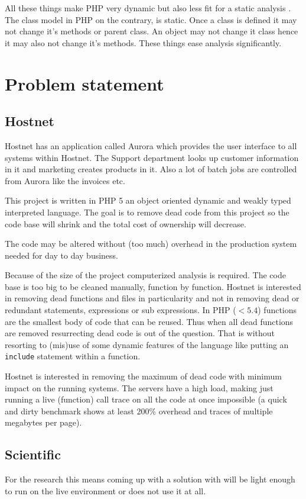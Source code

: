 \documentclass[a4paper,10pt,twocolumn]{article}
\begin{document}
All these things make PHP very dynamic but also less fit for a static analysis \cite{biggar2009,biggar2009draft,biggar2010,devries2007,tratt2009}. The class model in PHP on the contrary, is static. Once a class is defined it may not change it's methods or parent class. An object may not change it class hence it may also not change it's methods. These things ease analysis significantly.

\section{Problem statement}
\subsection{Hostnet}
Hostnet has an application called Auro\-ra which provides the user interface to all systems within Hostnet. The Support department looks up customer information in it and marketing creates products in it. Also a lot of batch jobs are controlled from Aurora like the invoices etc.

This project is written in PHP 5 an object oriented dynamic and weakly typed interpreted language. The goal is to remove dead code from this project so the code base will shrink and the total cost of ownership will decrease.

The code may be altered without (too much) overhead in the production system needed for day to day business.

Because of the size of the project computerized analysis is required. The code base is too big to be cleaned manually, function by function. Hostnet is interested in removing dead functions and files in particularity and not in removing dead or redundant statements, expressions or sub expressions. In PHP ($< 5.4$) functions are the smallest body of code that can be reused. Thus when all dead functions are removed resurrecting dead code is out of the question. That is without resorting to (mis)use of some dynamic features of the language like putting an \verb|include| statement within a function.

Hostnet is interested in removing the maximum of dead code with minimum impact on the running systems. The servers have a high load, making just running a live (function) call trace on all the code at once impossible (a quick and dirty benchmark shows at least 200\% overhead and traces of multiple megabytes per page).

\subsection{Scientific}
For the research this means coming up with a solution with will be light enough to run on the live environment or does not use it at all. 
\end{document}
